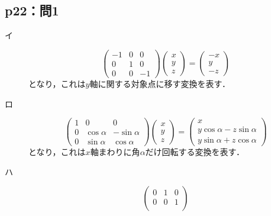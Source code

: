 \documentclass[uplatex,dvipdfmx,a4paper,10pt,fleqn]{jsarticle}
\begin{document}
\subsection*{p22：問1}
\begin{tleftbar}
\begin{description}
    \item[イ] 
    \[
        \begin{pmatrix}
            -1 & 0 & 0 \\
            0 & 1 & 0 \\
            0 & 0 & -1
        \end{pmatrix}
        \begin{pmatrix}
            x \\
            y \\
            z
        \end{pmatrix}
        =\begin{pmatrix}
            -x \\
            y \\
            -z
        \end{pmatrix}
        \]
        となり，これは$y$軸に関する対象点に移す変換を表す．
\item[ロ]
        \[
        \begin{pmatrix}
            1 & 0 & 0 \\
            0 & \cos \alpha & -\sin \alpha \\
            0 & \sin \alpha & \cos \alpha
        \end{pmatrix}
        \begin{pmatrix}
            x \\
            y \\
            z
        \end{pmatrix}
        =
        \begin{pmatrix}
            x \\
            y \cos \alpha -z \sin \alpha \\
            y \sin \alpha + z \cos \alpha 
        \end{pmatrix}
        \]
        となり，これは$x$軸まわりに角$\alpha$だけ回転する変換を表す．
    \item[ハ]
        \[
            \begin{pmatrix}
                0 & 1 & 0 \\
                0 & 0 & 1 \\

\end{pmatrix}\]
\end{description}
\end{tleftbar}
\end{document}

